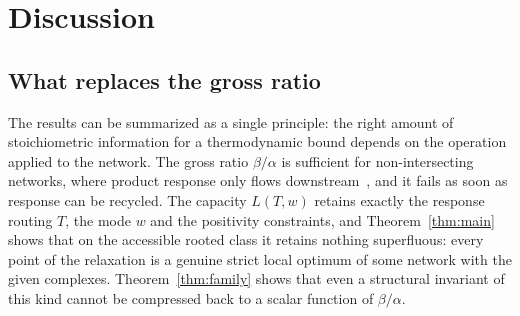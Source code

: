 \documentclass[11pt,reqno]{amsart}
\theoremstyle{plain}
\theoremstyle{definition}
\theoremstyle{remark}
\numberwithin{equation}{section}
\begin{document}
\section{Discussion}\label{sec:discussion}

\subsection{What replaces the gross ratio}
The results can be summarized as a single principle: the right amount of stoichiometric information for a thermodynamic bound depends on the operation applied to the network.  The gross ratio $\beta/\alpha$ is sufficient for non-intersecting networks, where product response only flows downstream~\cite{DDL24}, and it fails as soon as response can be recycled.  The capacity $L(T,w)$ retains exactly the response routing $T$, the mode $w$ and the positivity constraints, and Theorem~\ref{thm:main} shows that on the accessible rooted class it retains nothing superfluous: every point of the relaxation is a genuine strict local optimum of some network with the given complexes.  Theorem~\ref{thm:family} shows that even a structural invariant of this kind cannot be compressed back to a scalar function of $\beta/\alpha$.
\end{document}
